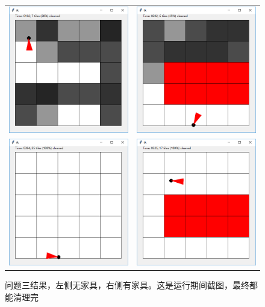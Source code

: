 \documentclass[logo,reportComp]{thesis}
\begin{document}
\begin{figure}[H]
\centering
\begin{tabular}{cc}
\includegraphics[width=0.4\linewidth]{fig/problem3-1.png}&
\includegraphics[width=0.4\linewidth]{fig/problem3-2.png}\\
\includegraphics[width=0.4\linewidth]{fig/problem3-3.png}&
\includegraphics[width=0.4\linewidth]{fig/problem3-4.png}
\end{tabular}
\caption{问题三结果，左侧无家具，右侧有家具。这是运行期间截图，最终都能清理完}
\label{fig:3}
\end{figure}
\end{document}
